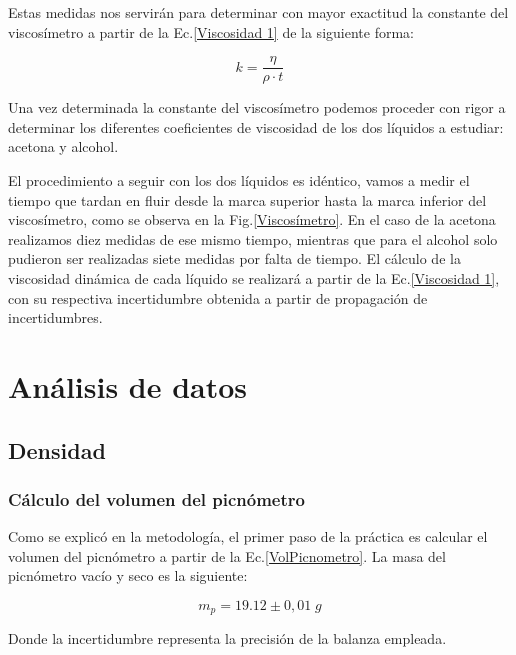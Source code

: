 \documentclass[a4paper,12pt,titlepage]{report}
\begin{document}
\par Estas medidas nos servirán para determinar con mayor exactitud la constante del viscosímetro a partir de la Ec.\ref{Viscosidad 1} de la siguiente forma:

\begin{equation}
    k = \frac{\eta}{\rho \cdot t}
    \label{Coef Viscosimetro}
\end{equation}

Una vez determinada la constante del viscosímetro podemos proceder con rigor a determinar los diferentes coeficientes de viscosidad de los dos líquidos a estudiar: acetona y alcohol.

\newpage

\par El procedimiento a seguir con los dos líquidos es idéntico, vamos a medir el tiempo que tardan en fluir desde la marca superior hasta la marca inferior del viscosímetro, como se observa en la Fig.\ref{Viscosímetro}. En el caso de la acetona realizamos diez medidas de ese mismo tiempo, mientras que para el alcohol solo pudieron ser realizadas siete medidas por falta de tiempo. El cálculo de la viscosidad dinámica de cada líquido se realizará a partir de la Ec.\ref{Viscosidad 1}, con su respectiva incertidumbre obtenida a partir de propagación de incertidumbres.



\section{Análisis de datos}

\subsection{Densidad}

\subsubsection{Cálculo del volumen del picnómetro}

Como se explicó en la metodología, el primer paso de la práctica es calcular el volumen del picnómetro a partir de la Ec.\ref{VolPicnometro}. La masa del picnómetro vacío y seco es la siguiente:

\begin{equation}
    m_{p} = 19.12 \pm 0,01 \; g
\end{equation}

Donde la incertidumbre representa la precisión de la balanza empleada.
\end{document}
